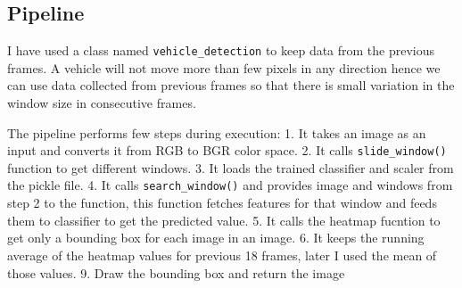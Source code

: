 \documentclass[11pt]{article}
\begin{document}
    \hypertarget{pipeline}{%
\subsection{Pipeline}\label{pipeline}}

I have used a class named \texttt{vehicle\_detection} to keep data from
the previous frames. A vehicle will not move more than few pixels in any
direction hence we can use data collected from previous frames so that
there is small variation in the window size in consecutive frames.

The pipeline performs few steps during execution: 1. It takes an image
as an input and converts it from RGB to BGR color space. 2. It calls
\texttt{slide\_window()} function to get different windows. 3. It loads
the trained classifier and scaler from the pickle file. 4. It calls
\texttt{search\_window()} and provides image and windows from step 2 to
the function, this function fetches features for that window and feeds
them to classifier to get the predicted value. 5. It calls the heatmap
fucntion to get only a bounding box for each image in an image. 6. It
keeps the running average of the heatmap values for previous 18 frames,
later I used the mean of those values. 9. Draw the bounding box and
return the image
\end{document}
